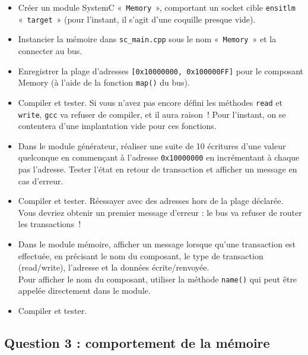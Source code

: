 \documentclass[12pt,a4paper]{article}
\begin{document}
\begin{itemize}
  \item Créer un module SystemC «~\lstinline|Memory|~», comportant un socket cible \verb|ensitlm| «~\lstinline|target|~» (pour l'instant, il s'agit d'une coquille presque vide).
  \item Instancier la mémoire dans \verb|sc_main.cpp| sous le nom « \lstinline|Memory| » et la connecter au bus.
        \vv
  \item Enregistrer la plage d'adresses \lstinline|[0x10000000, 0x100000FF]| pour le composant Memory (à l'aide de la fonction \lstinline|map()| du bus).
    \vv
  \item Compiler et tester.
        Si vous n'avez pas encore défini les méthodes \lstinline|read| et \lstinline|write|, \verb+gcc+ va refuser de compiler, et il aura raison~!
        Pour l'instant, on se contentera d'une implantation vide pour ces fonctions.
  \vv\vv
  \item Dans le module générateur, réaliser une suite de 10 écritures d'une valeur quelconque en commençant à l'adresse \lstinline|0x10000000| en incrémentant à chaque pas l'adresse.
        Tester l'état en retour de transaction et afficher un message en cas d'erreur.\vv
  \item Compiler et tester.
        Réessayer avec des adresses hors de la plage déclarée.
        Vous devriez obtenir un premier message d'erreur : le bus va refuser de router les transactions~!
  \item Dans le module mémoire, afficher un message lorsque qu'une transaction est effectuée, en précisant le nom du composant, le type de transaction (read/write), l'adresse et la données écrite/renvoyée.\\
        Pour afficher le nom du composant, utiliser la méthode \lstinline|name()| qui peut être appelée directement dans le module.\vv
  \item Compiler et tester.
\end{itemize}

\subsection*{Question 3 : comportement de la mémoire}
\end{document}
